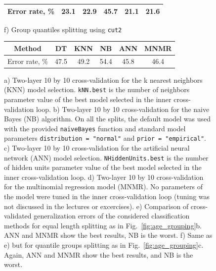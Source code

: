 \documentclass[10pt, paper=a4]{article}
\begin{document}
\begin{figure}[h!]
\begin{minipage}{0.49\textwidth}
\begin{center}
\begin{tabular}{c|c|c|c|c|c}
      \midrule
      Error rate, \% & 23.1 & 22.9 & {\color{red} 45.7} & {\color{green} 21.1} & {\color{green} 21.6}\\
      \bottomrule
    \end{tabular}
    \end{center}
  \end{minipage} \hfill
  \begin{minipage}{0.49\textwidth}
    f) Group quantiles splitting using \verb|cut2|\\
    \begin{center}
      \begin{tabular}{c|c|c|c|c|c}
        \toprule
        Method & DT & KNN & NB & ANN & MNMR\\
        \midrule
        Error rate, \% & 47.5 & 49.2 & {\color{red} 54.4} & {\color{green} 45.8} & {\color{green} 46.4}\\
        \bottomrule
      \end{tabular}
    \end{center}
  \end{minipage} \hfill
  \cprotect\caption{a) Two-layer 10 by 10 cross-validation for the k
    nearest neighbors (KNN) model selection.  \verb|kNN.best| is the
    number of neighbors parameter value of the best model selected in
    the inner cross-validation loop.  b) Two-layer 10 by 10
    cross-validation for the naive Bayes (NB) algorithm.  On all the
    splits, the default model was used with the provided
    \verb|naiveBayes| function and standard model parameters
    \verb|distribution = "normal"| and \verb|prior = "empirical"|.  c)
    Two-layer 10 by 10 cross-validation for the artificial neural
    network (ANN) model selection.  \verb|NHiddenUnits.best| is the
    number of hidden units parameter value of the best model selected
    in the inner cross-validation loop.  d) Two-layer 10 by 10
    cross-validation for the multinomial regression model (MNMR). No
    parameters of the model were tuned in the inner cross-validation
    loop (tuning was not discussed in the lectures or excercises). e)
    Comparison of cross-validated generalization errors of the
    considered classification methods for equal length splitting as in
    Fig.~\ref{fig:age_grouping}b.  ANN and MNMR show the best results,
    NB is the worst.  f) Same as e) but for quantile groups splitting
    as in Fig.~\ref{fig:age_grouping}c.  Again, ANN and MNMR show the
    best results, and NB is the worst.}
  \label{fig:performance}
\end{figure}
\end{document}
